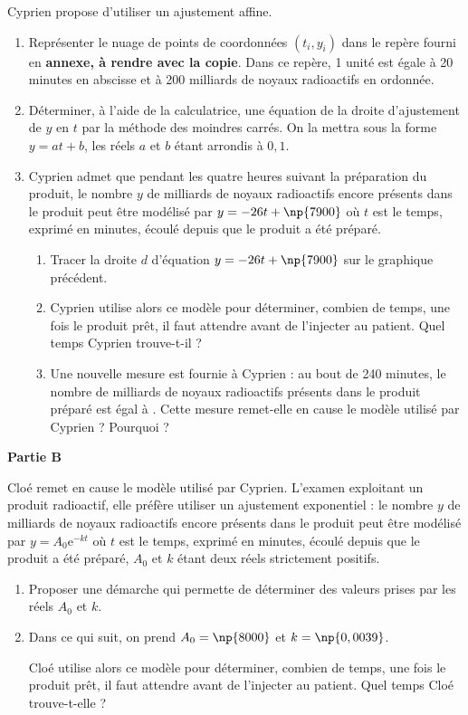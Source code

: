 \documentclass[10pt,a4paper,french]{article}
\newcommand{\e}{\text{e}}
\begin{document}
Cyprien propose d’utiliser un ajustement affine.

\medskip

\begin{enumerate}
\item  Représenter le nuage de points de coordonnées $(t_i , y_i)$ dans le repère fourni en \textbf{annexe, à rendre avec la copie}. Dans ce repère, 1 unité est égale à 20 minutes en abscisse et à 200 milliards de noyaux
radioactifs en ordonnée.
\item Déterminer, à l’aide de la calculatrice, une équation de la droite d’ajustement de $y$ en $t$ par la
méthode des moindres carrés. On la mettra sous la forme $y = at + b$, les réels $a$ et $b$ étant arrondis à $0,1$.
\item Cyprien admet que pendant les quatre heures suivant la préparation du produit, le nombre $y$ de
milliards de noyaux radioactifs encore présents dans le produit peut être modélisé par
$y= -26 t + \np{7900}$ où $t$ est le temps, exprimé en minutes, écoulé depuis que le produit a été préparé.
\begin{enumerate}
\item Tracer la droite $d$ d’équation $y = -26 t + \np{7 900}$ sur le graphique précédent.
\item Cyprien utilise alors ce modèle pour déterminer, combien de temps, une fois le produit prêt, il
faut attendre avant de l’injecter au patient. Quel temps Cyprien trouve-t-il ?
\item Une nouvelle mesure est fournie à Cyprien : au bout de 240 minutes, le nombre de milliards de
noyaux radioactifs présents dans le produit préparé est égal à . Cette mesure remet-elle en
cause le modèle utilisé par Cyprien ? Pourquoi ?
\end{enumerate}
\end{enumerate}

\medskip

\textbf{Partie B}

\medskip

Cloé remet en cause le modèle utilisé par Cyprien. L’examen exploitant un produit radioactif,  elle
préfère utiliser un ajustement exponentiel : le nombre $y$ de milliards de noyaux radioactifs encore
présents dans le produit peut être modélisé par  $y= A_0\e^{-k t} $ où $t$ est le temps, exprimé en minutes, écoulé
depuis que le produit a été préparé, $A_0$ et $k$ étant deux réels strictement positifs.

\medskip

\begin{enumerate}
\item Proposer une démarche qui permette de déterminer des valeurs prises par les réels $A_0$ et $k$.
\item Dans ce qui suit, on prend $A_0 = \np{8000}$ et $k = \np{0,0039}$.

Cloé utilise alors ce modèle pour déterminer, combien de temps, une fois le produit prêt, il faut
attendre avant de l’injecter au patient. Quel temps Cloé trouve-t-elle ?
\end{enumerate}
\end{document}
